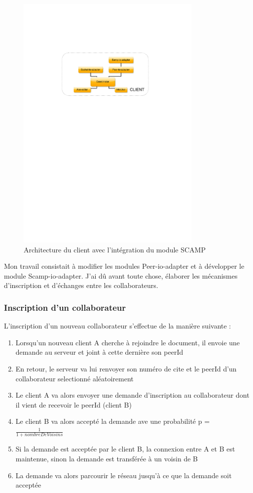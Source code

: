 \documentclass{tnreport}
\begin{document}
\begin{figure}[!h]
  \centering
  \includegraphics[width=9cm]{figures/MUTE-archi-scamp}
  \caption{Architecture du client avec l'intégration du module SCAMP}
  \label{fig:mute-archi-scamp}
\end{figure}

Mon travail consistait à modifier les modules Peer-io-adapter et à développer le module Scamp-io-adapter. J'ai dû avant toute chose, élaborer les mécanismes d'inscription et d'échanges entre les collaborateurs.

\subsubsection{Inscription d'un collaborateur}
L'inscription d'un nouveau collaborateur s'effectue de la manière suivante :
\begin{enumerate}
  \item Lorsqu'un nouveau client A cherche à rejoindre le document, il envoie une demande au serveur et joint à cette dernière son peerId
  \item En retour, le serveur va lui renvoyer son numéro de cite et le peerId d'un collaborateur selectionné aléatoirement
  \item Le client A va alors envoyer une demande d'inscription au collaborateur dont il vient de recevoir le peerId (client B)
  \item Le client B va alors accepté la demande ave une probabilité p = $\frac{1}{1 + nombreDeVoisins}$
  \item Si la demande est acceptée par le client B, la connexion entre A et B est maintenue, sinon la demande est transférée à un voisin de B
  \item La demande va alors parcourir le réseau jusqu'à ce que la demande soit acceptée\\
\end{enumerate}
\end{document}
